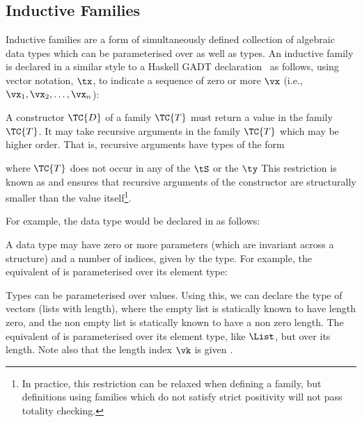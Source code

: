 \subsection{Inductive Families}

\label{sect:inductivefams}

Inductive families \cite{dybjer1994inductive} are a form of simultaneously
defined collection of algebraic data types which can be parameterised over
 as well as types.  An inductive family is declared 
in a similar style to a Haskell GADT declaration~\cite{pj2006gadts}
as
follows, using vector notation, $\tx$, to indicate a
sequence of zero or more $\vx$ (i.e., $\vx_1,\vx_2,\ldots,\vx_n$):


A constructor $\TC{D}$ of a family $\TC{T}$ must return a value in the family
$\TC{T}$.
It may take recursive arguments in the family $\TC{T}$ which may be
higher order. That is, recursive arguments have types of the form


where $\TC{T}$ does not occur in any of the $\tS$ or the $\ty$
This restriction is known as
 and ensures that recursive arguments of the
constructor are structurally smaller than the value itself\footnote{In
practice, this restriction can be relaxed when defining a family, but definitions
using families which do not satisfy strict positivity will not pass totality
checking.}.

For example, the \Idris{} data type  would be declared in \TT{} as follows:

\DM{
\Data\hg\Nat\Hab\Type\hg\Where\hg\Z\Hab\Nat\;\mid\;\suc\Hab\fbind{\vk}{\Nat}{\Nat}
}

A data type may have zero or more parameters (which are invariant
across a structure) and a number of indices, given by the type. For
example, the \TT{} equivalent of  is parameterised over its element type:

\DM{
\AR{
\Data\hg\List\Hab(\va\Hab\Type)\to\Type\hg\Where\\
\hg\hg
\ARd{
& \nil\Hab\List\;\va\\
\mid & (\cons)\Hab\fbind{\vx}{\va}{\fbind{\vxs}{\List\;\va}{\List\;\va}}
}
}
}

Types can be
parameterised over values. Using this, we can declare the type of
vectors (lists with length), where the empty list is statically known
to have length zero, and the non empty list is statically known to
have a non zero length. The \TT{} equivalent of  is parameterised over its element type,
like $\List$, but  over its length. Note also that the length
index $\vk$ is given .

